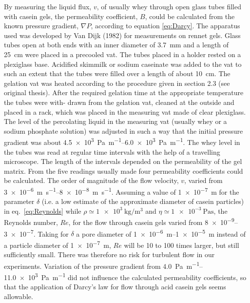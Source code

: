\documentclass[12pt,a4paper]{article}
\begin{document}
By measuring the liquid flux, $v$, of usually whey through open glass tubes filled with casein gels, the permeability coefficient, $B$, could be calculated from the known pressure gradient, $\nabla P$, according to equation \ref{eq:Darcy}. The apparatus used was developed by Van Dijk (1982) for measurements on rennet gels. Glass tubes open at both ends with an inner diameter of \SI{3.7}{\milli\metre} and a length of \SI{25}{\centi\metre} were placed in a precooled vat. The tubes placed in a holder rested on a plexiglass base. Acidified skimmilk or sodium caseinate was added to the vat to such an extent that the tubes were filled over a length of about \SI{10}{\centi\metre}. The gelation vat was heated according to the procedure given in section 2.3 (see original thesis). After the required gelation time at the appropriate temperature the tubes were with- drawn from the gelation vat, cleaned at the outside and placed in a rack, which was placed in the measuring vat made of clear plexiglass. The level of the percolating liquid in the measuring vat (usually whey or a sodium phosphate solution) was adjusted in such a way that the initial pressure gradient was about \SIrange{4.5e3}{6.0e3}{\pascal\per\metre}. The whey level in the tubes was read at regular time intervals with the help of a travelling microscope. The length of the intervals depended on the permeability of the gel matrix. From the five readings usually made four permeability coefficients could be calculated. The order of magnitude of the flow velocity, $v$, varied from \SIrange{3e-6}{8e-8}{\metre\per\second}. Assuming a value of \SI{1e-7}{\metre} for the parameter $\delta$ (i.e. a low estimate of the approximate diameter of casein particles) in eq.~\ref{eq:Reynolds} while $\rho\simeq \SI{1e3}{\kilo\gram\per\cubic\metre}$ and $\eta \simeq \SI{1e-3}{\pascal\second}$, the Reynolds number, $Re$, for the flow through casein gels varied from \SIrange{8e-9}{3e-7}{}. Taking for $\delta$ a pore diameter of \SIrange{1e-6}{1e-5}{\metre} instead of a particle diameter of \SI{1e-7}{\metre}, $Re$ will be 10 to 100 times larger, but still sufficiently small. There was therefore no risk for turbulent flow in our experiments. Variation of the pressure gradient from \SIrange{4.0}{11.0e3}{\pascal\per\metre} did not influence the calculated permeability coefficients, so that the application of Darcy's law for flow through acid casein gels seems allowable.
\end{document}

